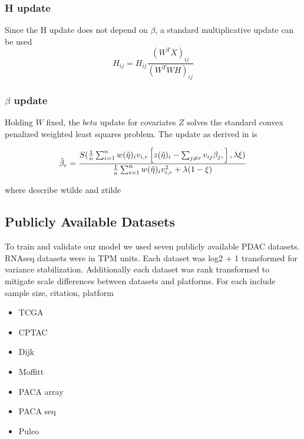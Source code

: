 \documentclass[
]{article}
\begin{document}
\subsubsection{H update}\label{h-update}

Since the H update does not depend on \(\beta\), a standard
multiplicative update can be used \begin{equation}
    H_{ij} = H_{ij} \frac{(W^TX)_{ij}}{(W^TWH)_{ij}}
\end{equation}

\subsubsection{\texorpdfstring{\(\beta\)
update}{\textbackslash beta update}}\label{beta-update}

Holding \(W\) fixed, the \(beta\) update for covariates \(Z\) solves the
standard convex penalized weighted least squares problem. The update as
derived in \cite{simon2011regularization} is

\begin{equation}
    \hat{\beta}_r = \frac{S(\frac{1}{n}\sum_{i=1}^n w(\Tilde{\eta})_i v_{i,r} \left[ z(\Tilde{\eta})_i - \sum_{j\ne r} v_{ij} \beta_j,\right], \lambda\xi)}{\frac{1}{n}\sum_{i=1}^n w(\Tilde{\eta})_i v_{i,r}^2 + \lambda(1-\xi)}
\end{equation}

where describe wtilde and ztilde

\subsection{Publicly Available Datasets}

To train and validate our model we used seven publicly available PDAC
datasets. RNAseq datasets were in TPM units. Each dataset was log2 + 1
transformed for variance stabilization. Additionally each dataset was
rank transformed to mitigate scale differences between datasets and
platforms. For each include sample size, citation, platform

\begin{itemize}
  \item TCGA 
  \item CPTAC
  \item Dijk
  \item Moffitt
  \item PACA array
  \item PACA seq
  \item Puleo
\end{itemize}
\end{document}
